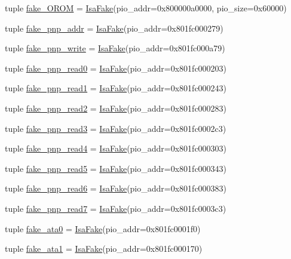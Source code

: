 \begin{DoxyCompactItemize}
\item 
tuple \hyperlink{classTsunami_1_1Tsunami_a08b63ccd915fcf9f1bde7f8b8b9a0d5a}{fake\_\-OROM} = \hyperlink{classIsaFake}{IsaFake}(pio\_\-addr=0x800000a0000, pio\_\-size=0x60000)
\item 
tuple \hyperlink{classTsunami_1_1Tsunami_a136c06a7053d01d772fe86a87025d2af}{fake\_\-pnp\_\-addr} = \hyperlink{classIsaFake}{IsaFake}(pio\_\-addr=0x801fc000279)
\item 
tuple \hyperlink{classTsunami_1_1Tsunami_a767e330a3e0c1d639fc7a99fa2d4c95b}{fake\_\-pnp\_\-write} = \hyperlink{classIsaFake}{IsaFake}(pio\_\-addr=0x801fc000a79)
\item 
tuple \hyperlink{classTsunami_1_1Tsunami_ad8e5228e6e069baccf33d779596afb18}{fake\_\-pnp\_\-read0} = \hyperlink{classIsaFake}{IsaFake}(pio\_\-addr=0x801fc000203)
\item 
tuple \hyperlink{classTsunami_1_1Tsunami_a95637880b1d8c7906e2f4d852d971ad2}{fake\_\-pnp\_\-read1} = \hyperlink{classIsaFake}{IsaFake}(pio\_\-addr=0x801fc000243)
\item 
tuple \hyperlink{classTsunami_1_1Tsunami_a325d625e8999b132663c89f44c5d2dfb}{fake\_\-pnp\_\-read2} = \hyperlink{classIsaFake}{IsaFake}(pio\_\-addr=0x801fc000283)
\item 
tuple \hyperlink{classTsunami_1_1Tsunami_ad74c7bcfe04649ebb5581e7ba242f974}{fake\_\-pnp\_\-read3} = \hyperlink{classIsaFake}{IsaFake}(pio\_\-addr=0x801fc0002c3)
\item 
tuple \hyperlink{classTsunami_1_1Tsunami_a86c5f0c7f90e62ae01ac2dd5e974b07a}{fake\_\-pnp\_\-read4} = \hyperlink{classIsaFake}{IsaFake}(pio\_\-addr=0x801fc000303)
\item 
tuple \hyperlink{classTsunami_1_1Tsunami_ac93534474c3b3c6f5aead7ee70349777}{fake\_\-pnp\_\-read5} = \hyperlink{classIsaFake}{IsaFake}(pio\_\-addr=0x801fc000343)
\item 
tuple \hyperlink{classTsunami_1_1Tsunami_af5f57028760bf54259548ee2e15d5330}{fake\_\-pnp\_\-read6} = \hyperlink{classIsaFake}{IsaFake}(pio\_\-addr=0x801fc000383)
\item 
tuple \hyperlink{classTsunami_1_1Tsunami_af90362c353138e544ffd9458c8820892}{fake\_\-pnp\_\-read7} = \hyperlink{classIsaFake}{IsaFake}(pio\_\-addr=0x801fc0003c3)
\item 
tuple \hyperlink{classTsunami_1_1Tsunami_adbf807504cfb455e68d13f14e31b9a2e}{fake\_\-ata0} = \hyperlink{classIsaFake}{IsaFake}(pio\_\-addr=0x801fc0001f0)
\item 
tuple \hyperlink{classTsunami_1_1Tsunami_a6bc7a94358dc93e4215db5e80f62f338}{fake\_\-ata1} = \hyperlink{classIsaFake}{IsaFake}(pio\_\-addr=0x801fc000170)

\end{DoxyCompactItemize}
